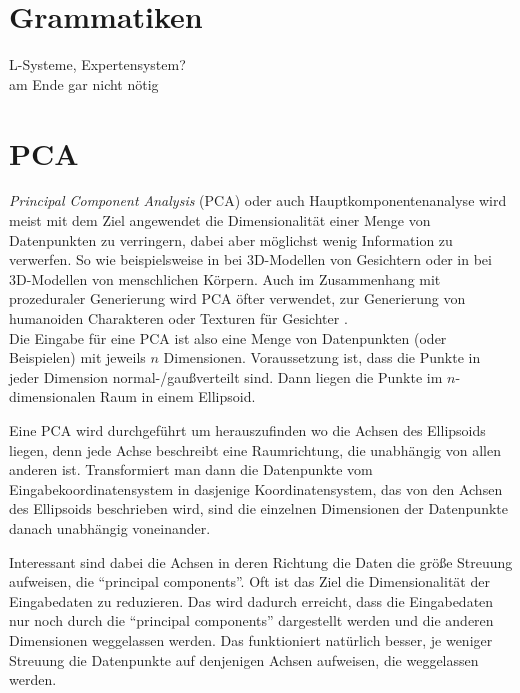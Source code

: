 \section{Grammatiken}

L-Systeme, Expertensystem?\\
am Ende gar nicht nötig


\section{PCA} %

 
 \emph{Principal Component Analysis} (PCA) oder auch Hauptkomponentenanalyse \cite{PCA} wird meist mit dem Ziel angewendet die Dimensionalität einer Menge von Datenpunkten zu verringern, dabei aber möglichst wenig Information zu verwerfen.
 So wie beispielsweise in \cite{PCA_faces} bei 3D-Modellen von Gesichtern oder in \cite{PCA_bodies} bei 3D-Modellen von menschlichen Körpern. Auch im Zusammenhang mit prozeduraler Generierung wird PCA öfter verwendet, \zb zur Generierung von humanoiden Charakteren \cite{ProceduralCharacterGeneration} oder Texturen für Gesichter \cite{GeneratingFacialTextures}. \\
 Die Eingabe für eine PCA ist also eine Menge von Datenpunkten (oder Beispielen) mit jeweils $n$ Dimensionen. Voraussetzung ist, dass die Punkte in jeder Dimension normal-/gaußverteilt sind. Dann liegen die Punkte im $n$-dimensionalen Raum in einem Ellipsoid.
 
 Eine PCA wird durchgeführt um herauszufinden wo die Achsen des Ellipsoids liegen, denn jede Achse beschreibt eine Raumrichtung, die unabhängig von allen anderen ist.
 Transformiert man dann die Datenpunkte vom Eingabekoordinatensystem in dasjenige Koordinatensystem, das von den Achsen des Ellipsoids beschrieben wird, sind die einzelnen Dimensionen der Datenpunkte danach unabhängig voneinander.
 
 Interessant sind dabei die Achsen in deren Richtung die Daten die größe Streuung aufweisen, die "`principal components"'. Oft ist das Ziel die Dimensionalität der Eingabedaten zu reduzieren. Das wird dadurch erreicht, dass die Eingabedaten nur noch durch die "`principal components"' dargestellt werden und die anderen Dimensionen weggelassen werden. Das funktioniert natürlich besser, je weniger Streuung die Datenpunkte auf denjenigen Achsen aufweisen, die weggelassen werden.
 
